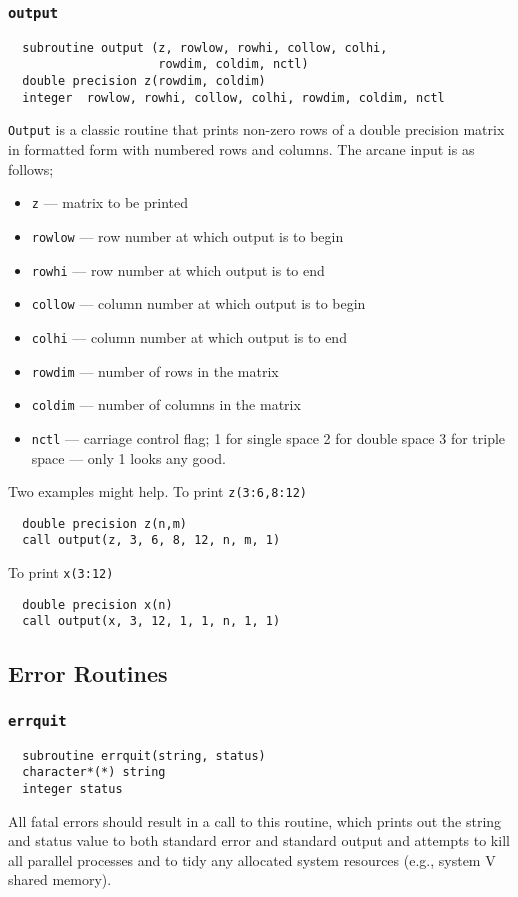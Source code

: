 \subsubsection{{\tt output}}
\begin{verbatim}
  subroutine output (z, rowlow, rowhi, collow, colhi,
                     rowdim, coldim, nctl)
  double precision z(rowdim, coldim)
  integer  rowlow, rowhi, collow, colhi, rowdim, coldim, nctl
\end{verbatim}
{\tt Output} is a classic routine that prints non-zero rows of a
double precision matrix in formatted form with numbered rows
and columns.  The arcane input is as follows;
\begin{itemize}
\item  {\tt z} --- matrix to be printed
\item  {\tt rowlow} --- row number at which output is to begin
\item  {\tt rowhi} --- row number at which output is to end
\item  {\tt collow} --- column number at which output is to begin
\item  {\tt colhi} --- column number at which output is to end
\item  {\tt rowdim} --- number of rows in the matrix
\item  {\tt coldim} --- number of columns in the matrix
\item {\tt nctl} --- carriage control flag; 1 for single space 2 for
  double space 3 for triple space --- only 1 looks any good.
\end{itemize}
Two examples might help.  To print {\tt z(3:6,8:12)}
\begin{verbatim}
  double precision z(n,m)
  call output(z, 3, 6, 8, 12, n, m, 1)
\end{verbatim}
To print {\tt x(3:12)}
\begin{verbatim}
  double precision x(n)
  call output(x, 3, 12, 1, 1, n, 1, 1)
\end{verbatim}

\subsection{Error Routines}

\subsubsection{{\tt errquit}}
\label{errquit}
\begin{verbatim}
  subroutine errquit(string, status)
  character*(*) string
  integer status
\end{verbatim}
All fatal errors should result in a call to this routine, which prints
out the string and status value to both standard error and standard
output and attempts to kill all parallel processes and to tidy any
allocated system resources (e.g., system V shared memory).

